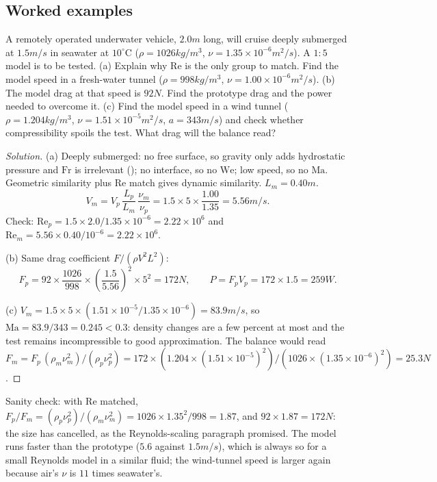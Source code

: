 \subsection*{Worked examples}

\begin{example}
A remotely operated underwater vehicle, $2.0\unit{m}$ long, will cruise deeply submerged at $1.5\unit{m/s}$ in seawater at $10^\circ$C ($\rho = 1026\unit{kg/m^3}$, $\nu = 1.35\times10^{-6}\unit{m^2/s}$). A $1{:}5$ model is to be tested.
(a) Explain why $\mathrm{Re}$ is the only group to match. Find the model speed in a fresh-water tunnel ($\rho = 998\unit{kg/m^3}$, $\nu = 1.00\times10^{-6}\unit{m^2/s}$).
(b) The model drag at that speed is $92\unit{N}$. Find the prototype drag and the power needed to overcome it.
(c) Find the model speed in a wind tunnel ($\rho = 1.204\unit{kg/m^3}$, $\nu = 1.51\times10^{-5}\unit{m^2/s}$, $a = 343\unit{m/s}$) and check whether compressibility spoils the test. What drag will the balance read?
\end{example}

\begin{proof}[Solution]
(a) Deeply submerged: no free surface, so gravity only adds hydrostatic pressure and $\mathrm{Fr}$ is irrelevant (); no interface, so no $\mathrm{We}$; low speed, so no $\mathrm{Ma}$. Geometric similarity plus $\mathrm{Re}$ match gives dynamic similarity. $L_m = 0.40\unit{m}$.
\[
V_m = V_p\,\frac{L_p}{L_m}\,\frac{\nu_m}{\nu_p} = 1.5 \times 5 \times \frac{1.00}{1.35} = 5.56\unit{m/s}.
\]
Check: $\mathrm{Re}_p = 1.5 \times 2.0/1.35\times10^{-6} = 2.22\times10^6$ and $\mathrm{Re}_m = 5.56 \times 0.40/10^{-6} = 2.22\times10^6$.

(b) Same drag coefficient $F/(\rho V^2L^2)$:
\[
F_p = 92 \times \frac{1026}{998} \times \left(\frac{1.5}{5.56}\right)^2 \times 5^2 = 172\unit{N}, \qquad P = F_pV_p = 172 \times 1.5 = 259\unit{W}.
\]

(c) $V_m = 1.5 \times 5 \times (1.51\times10^{-5}/1.35\times10^{-6}) = 83.9\unit{m/s}$, so $\mathrm{Ma} = 83.9/343 = 0.245 < 0.3$: density changes are a few percent at most and the test remains incompressible to good approximation. The balance would read $F_m = F_p\,(\rho_m\nu_m^2)/(\rho_p\nu_p^2) = 172 \times (1.204 \times (1.51\times10^{-5})^2)/(1026 \times (1.35\times10^{-6})^2) = 25.3\unit{N}$.
\end{proof}

Sanity check: with $\mathrm{Re}$ matched, $F_p/F_m = (\rho_p\nu_p^2)/(\rho_m\nu_m^2) = 1026 \times 1.35^2/998 = 1.87$, and $92 \times 1.87 = 172\unit{N}$: the size has cancelled, as the Reynolds-scaling paragraph promised. The model runs faster than the prototype ($5.6$ against $1.5\unit{m/s}$), which is always so for a small Reynolds model in a similar fluid; the wind-tunnel speed is larger again because air's $\nu$ is $11$ times seawater's.

